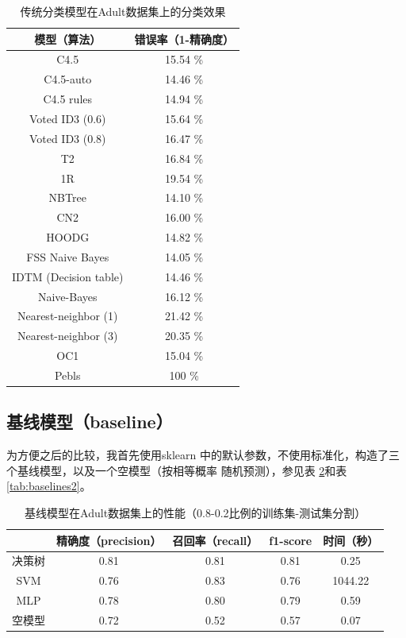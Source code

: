 \documentclass[12pt,a4paper]{article}
\theoremstyle{definition}
\begin{document}
\begin{table}[H]
	\centering
	\begin{tabular}{c|c}
		模型（算法） & 错误率（1-精确度） \\
		\hline
		\hline
	
		C4.5 & 15.54 \% \\
		C4.5-auto & 14.46 \% \\
		C4.5 rules & 14.94 \% \\
		Voted ID3 (0.6) & 15.64 \% \\
		Voted ID3 (0.8) & 16.47 \% \\
		T2 & 16.84 \% \\
		1R & 19.54 \% \\
		NBTree & 14.10 \% \\
		CN2 & 16.00 \% \\
		HOODG & 14.82 \% \\
		FSS Naive Bayes & 14.05 \% \\
		IDTM (Decision table) & 14.46 \% \\
		Naive-Bayes & 16.12 \% \\
		Nearest-neighbor (1) & 21.42 \% \\
		Nearest-neighbor (3) & 20.35 \% \\
		OC1 & 15.04 \% \\
		Pebls & 100 \% \\
		
	\end{tabular}
	\caption{传统分类模型在Adult数据集上的分类效果}
	\label{tab:bench}
\end{table}

\subsection{基线模型（baseline）}

为方便之后的比较，我首先使用sklearn \cite{sklearn}中的默认参数，不使用标准化，构造了三个基线模型，以及一个空模型（按相等概率 随机预测），参见表 \ref{tab:baselines1}和表 \ref{tab:baselines2}。

\begin{table}[H]
	\renewcommand\arraystretch{1.35}
	\caption{基线模型在Adult数据集上的性能（0.8-0.2比例的训练集-测试集分割）}
	\label{tab:baselines1}
	\centering
	
	\begin{tabular}{c|c|c|c|c}
		\centering
		 & 精确度（precision） & 召回率（recall） & f1-score & 时间（秒） \\
		\hline
		\hline
		
		决策树 & 0.81 & 0.81 & 0.81 & 0.25 \\
		SVM & 0.76 & 0.83 & 0.76 & 1044.22 \\
		MLP & 0.78 & 0.80 & 0.79 & 0.59 \\
		空模型 & 0.72 & 0.52 & 0.57 & 0.07 \\

	\end{tabular}
\end{table}
\end{document}
